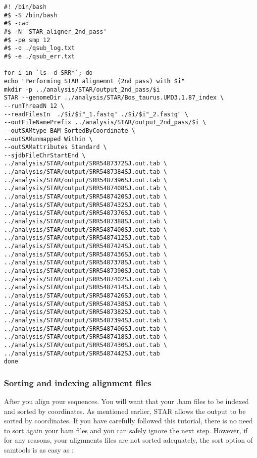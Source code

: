 \begin{verbatim}
#! /bin/bash
#$ -S /bin/bash
#$ -cwd
#$ -N 'STAR_aligner_2nd_pass'
#$ -pe smp 12
#$ -o ./qsub_log.txt
#$ -e ./qsub_err.txt

for i in `ls -d SRR*`; do	
echo "Performing STAR alignemnt (2nd pass) with $i"
mkdir -p ../analysis/STAR/output_2nd_pass/$i
STAR --genomeDir ../analysis/STAR/Bos_taurus.UMD3.1.87_index \
--runThreadN 12 \
--readFilesIn  ./$i/$i"_1.fastq" ./$i/$i"_2.fastq" \
--outFileNamePrefix ../analysis/STAR/output_2nd_pass/$i \
--outSAMtype BAM SortedByCoordinate \
--outSAMunmapped Within \
--outSAMattributes Standard \
--sjdbFileChrStartEnd \
../analysis/STAR/output/SRR5487372SJ.out.tab \
../analysis/STAR/output/SRR5487384SJ.out.tab \
../analysis/STAR/output/SRR5487396SJ.out.tab \
../analysis/STAR/output/SRR5487408SJ.out.tab \
../analysis/STAR/output/SRR5487420SJ.out.tab \
../analysis/STAR/output/SRR5487432SJ.out.tab \
../analysis/STAR/output/SRR5487376SJ.out.tab \
../analysis/STAR/output/SRR5487388SJ.out.tab \
../analysis/STAR/output/SRR5487400SJ.out.tab \
../analysis/STAR/output/SRR5487412SJ.out.tab \
../analysis/STAR/output/SRR5487424SJ.out.tab \
../analysis/STAR/output/SRR5487436SJ.out.tab \
../analysis/STAR/output/SRR5487378SJ.out.tab \
../analysis/STAR/output/SRR5487390SJ.out.tab \
../analysis/STAR/output/SRR5487402SJ.out.tab \
../analysis/STAR/output/SRR5487414SJ.out.tab \
../analysis/STAR/output/SRR5487426SJ.out.tab \
../analysis/STAR/output/SRR5487438SJ.out.tab \
../analysis/STAR/output/SRR5487382SJ.out.tab \
../analysis/STAR/output/SRR5487394SJ.out.tab \
../analysis/STAR/output/SRR5487406SJ.out.tab \
../analysis/STAR/output/SRR5487418SJ.out.tab \
../analysis/STAR/output/SRR5487430SJ.out.tab \
../analysis/STAR/output/SRR5487442SJ.out.tab
done

\end{verbatim}



\subsubsection{Sorting and indexing alignment files}


After you align your sequences. You will want that your .bam files to be indexed and sorted by coordinates. As mentioned earlier, STAR allows the output to be sorted by coordinates. If you have carefully followed this tutorial, there is no need to sort again your bam files and you can safely ignore the next step. However, if for any reasons, your aligmnents files are not sorted adequately, the sort option of samtools is as easy as :

